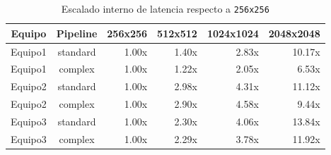 \begin{table}[htbp]
\centering
\renewcommand{\arraystretch}{1.15}
\setlength{\tabcolsep}{5pt}
\begin{tabular}{|c|c|r|r|r|r|}
\hline
\rowcolor[gray]{0.90}
\textbf{Equipo} & \textbf{Pipeline} & \textbf{256x256} & \textbf{512x512} & \textbf{1024x1024} & \textbf{2048x2048} \\
\hline
Equipo1 & standard & 1.00x & 1.40x & 2.83x & 10.17x \\
\hline
Equipo1 & complex & 1.00x & 1.22x & 2.05x & 6.53x \\
\hline
Equipo2 & standard & 1.00x & 2.98x & 4.31x & 11.12x \\
\hline
Equipo2 & complex & 1.00x & 2.90x & 4.58x & 9.44x \\
\hline
Equipo3 & standard & 1.00x & 2.30x & 4.06x & 13.84x \\
\hline
Equipo3 & complex & 1.00x & 2.29x & 3.78x & 11.92x \\
\hline
\end{tabular}
\caption{Escalado interno de latencia respecto a \texttt{256x256}}
\label{tab:interteam_self_scaling_256_gpu}
\end{table}
